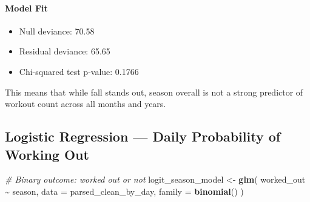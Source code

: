 \documentclass[
  11pt,
]{article}
\newenvironment{Shaded}{\begin{snugshade}}{\end{snugshade}}
\newcommand{\AttributeTok}[1]{\textcolor[rgb]{0.13,0.29,0.53}{#1}}
\newcommand{\CommentTok}[1]{\textcolor[rgb]{0.56,0.35,0.01}{\textit{#1}}}
\newcommand{\FunctionTok}[1]{\textcolor[rgb]{0.13,0.29,0.53}{\textbf{#1}}}
\newcommand{\NormalTok}[1]{#1}
\newcommand{\OtherTok}[1]{\textcolor[rgb]{0.56,0.35,0.01}{#1}}
\newcommand{\SpecialCharTok}[1]{\textcolor[rgb]{0.81,0.36,0.00}{\textbf{#1}}}
\providecommand{\tightlist}{%
  \setlength{\itemsep}{0pt}\setlength{\parskip}{0pt}}
\begin{document}
\paragraph{Model Fit}\label{model-fit}

\begin{itemize}
\tightlist
\item
  Null deviance: 70.58
\item
  Residual deviance: 65.65
\item
  Chi-squared test p-value: 0.1766
\end{itemize}

This means that while fall stands out, season overall is not a strong
predictor of workout count across all months and years.

\subsection{Logistic Regression --- Daily Probability of Working
Out}\label{logistic-regression-daily-probability-of-working-out}

\begin{Shaded}
\begin{Highlighting}[]
\CommentTok{\# Binary outcome: worked out or not}
\NormalTok{logit\_season\_model }\OtherTok{\textless{}{-}} \FunctionTok{glm}\NormalTok{(}
\NormalTok{  worked\_out }\SpecialCharTok{\textasciitilde{}}\NormalTok{ season,}
  \AttributeTok{data =}\NormalTok{ parsed\_clean\_by\_day,}
  \AttributeTok{family =} \FunctionTok{binomial}\NormalTok{()}
\NormalTok{)}
\end{Highlighting}
\end{Shaded}
\end{document}

